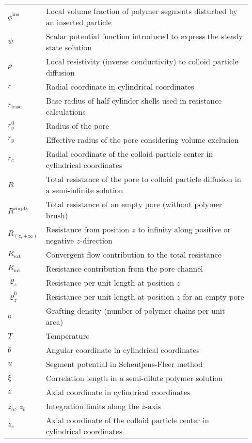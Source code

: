 \documentclass[10pt, a4paper]{article}
\begin{document}
\begin{tabularx}{\linewidth}{l X}
    $\phi^{\text{ins}}$ & Local volume fraction of polymer segments disturbed by an inserted particle \\
    $\psi$ & Scalar potential function introduced to express the steady state solution \\
    $\rho$ & Local resistivity (inverse conductivity) to colloid particle diffusion \\
    $r$ & Radial coordinate in cylindrical coordinates \\
    $r_{\text{base}}$ & Base radius of half-cylinder shells used in resistance calculations\\
    $r_{\text{p}}^{0}$ & Radius of the pore \\
    $r_{\text{p}}$ & Effective radius of the pore considering volume exclusion \\
    $r_{c}$ & Radial coordinate of the colloid particle center in cylindrical coordinates \\
    $R$ & Total resistance of the pore to colloid particle diffusion in a semi-infinite solution \\
    $R^{\text{empty}}$ & Total resistance of an empty pore (without polymer brush) \\
    $R_{(z, \pm\infty)}$ & Resistance from position $z$ to infinity along positive or negative $z$-direction \\
    $R_{\text{ext}}$ & Convergent flow contribution to the total resistance \\
    $R_{\text{int}}$ & Resistance contribution from the pore channel \\
    $\varrho_{z}$ & Resistance per unit length at position $z$ \\
    $\varrho_{z}^{0}$ & Resistance per unit length at position $z$ for an empty pore \\
    $\sigma$ & Grafting density (number of polymer chains per unit area) \\
    $T$ & Temperature \\
    $\theta$ & Angular coordinate in cylindrical coordinates \\
    $u$ & Segment potential in Scheutjens-Fleer method\\
    $\xi$ & Correlation length in a semi-dilute polymer solution \\
    $z$ & Axial coordinate in cylindrical coordinates \\
    $z_a$, $z_b$ & Integration limits along the $z$-axis \\
    $z_{c}$ & Axial coordinate of the colloid particle center in cylindrical coordinates \\

\end{tabularx}
\end{document}
